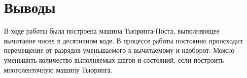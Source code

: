 \section{Выводы}
В ходе работы была построена машина Тьюринга-Поста, выполняющее вычитание чисел в десятичном коде. В процессе работы постоянно происходит перемещение от разрядов уменьшаемого к вычитаемому и наоборот. Можно уменьшить количество выполняемых шагов и состояний, если построить многоленточную машину Тьюринга.

